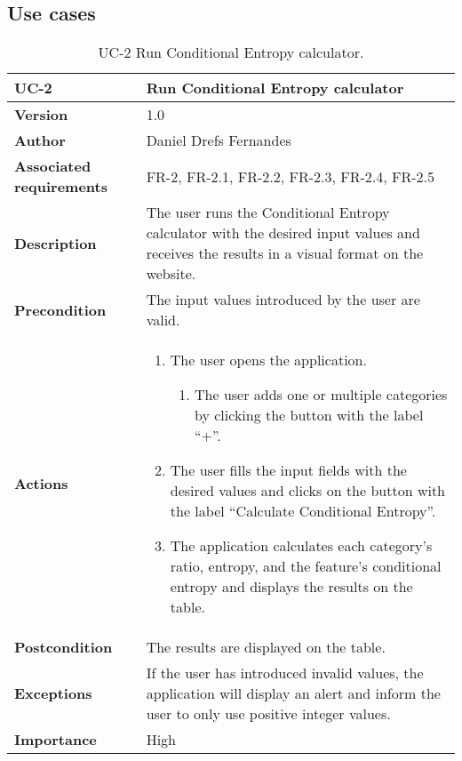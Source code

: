 \subsection{Use cases}
\begin{table}[p]
	\centering
	\begin{tabularx}{\linewidth}{ p{} p{} }
		\toprule
		\textbf{UC-2}    & \textbf{Run Conditional Entropy calculator}\\
		\toprule
		\textbf{Version}              & 1.0    \\
		\textbf{Author}                & Daniel Drefs Fernandes \\
		\textbf{Associated requirements} & FR-2, FR-2.1, FR-2.2, FR-2.3, FR-2.4, FR-2.5 \\
		\textbf{Description}          & The user runs the Conditional Entropy calculator with the desired input values and receives the results in a visual format on the website. \\
		\textbf{Precondition}         & The input values introduced by the user are valid. \\
		\textbf{Actions}             &
		\begin{enumerate}
			\def\labelenumi{\arabic{enumi}.}
			\tightlist
			\item The user opens the application.
            \begin{enumerate}
                \item The user adds one or multiple categories by clicking the button with the label ``+''.
            \end{enumerate}
			\item The user fills the input fields with the desired values and clicks on the button with the label ``Calculate Conditional Entropy''.
            \item The application calculates each category's ratio, entropy, and the feature's conditional entropy and displays the results on the table.
		\end{enumerate}\\
		\textbf{Postcondition}        & The results are displayed on the table. \\
		\textbf{Exceptions}          & If the user has introduced invalid values, the application will display an alert and inform the user to only use positive integer values. \\
		\textbf{Importance}          & High \\
		\bottomrule
	\end{tabularx}
	\caption{UC-2 Run Conditional Entropy calculator.}
\end{table}

